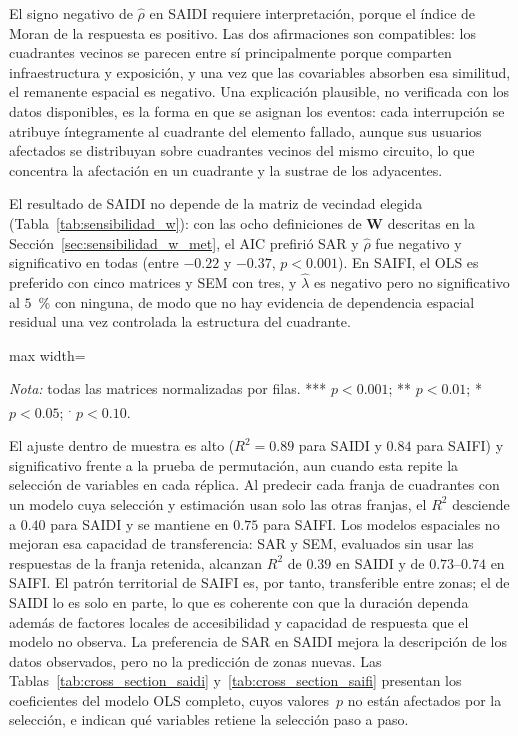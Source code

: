 El signo negativo de $\hat\rho$ en SAIDI requiere interpretación, porque el índice de Moran de la respuesta es positivo. Las dos afirmaciones son compatibles: los cuadrantes vecinos se parecen entre sí principalmente porque comparten infraestructura y exposición, y una vez que las covariables absorben esa similitud, el remanente espacial es negativo. Una explicación plausible, no verificada con los datos disponibles, es la forma en que se asignan los eventos: cada interrupción se atribuye íntegramente al cuadrante del elemento fallado, aunque sus usuarios afectados se distribuyan sobre cuadrantes vecinos del mismo circuito, lo que concentra la afectación en un cuadrante y la sustrae de los adyacentes.

El resultado de SAIDI no depende de la matriz de vecindad elegida (Tabla~\ref{tab:sensibilidad_w}): con las ocho definiciones de $\mathbf{W}$ descritas en la Sección~\ref{sec:sensibilidad_w_met}, el AIC prefirió SAR y $\hat\rho$ fue negativo y significativo en todas (entre $-0{.}22$ y $-0{.}37$, $p<0{.}001$). En SAIFI, el OLS es preferido con cinco matrices y SEM con tres, y $\hat\lambda$ es negativo pero no significativo al $5$~\% con ninguna, de modo que no hay evidencia de dependencia espacial residual una vez controlada la estructura del cuadrante.

\begin{table}[!htbp]
\centering
\small
\caption{Sensibilidad de los modelos espaciales de corte transversal a la matriz de vecindad}
\label{tab:sensibilidad_w}
\begin{adjustbox}{max width=\linewidth}

\end{adjustbox}

\vspace{2pt}
\noindent\footnotesize\textit{Nota:} todas las matrices normalizadas por filas. *** $p<0{.}001$; ** $p<0{.}01$; * $p<0{.}05$; \textsuperscript{.} $p<0{.}10$.
\end{table}

El ajuste dentro de muestra es alto ($R^2=0{.}89$ para SAIDI y $0{.}84$ para SAIFI) y significativo frente a la prueba de permutación, aun cuando esta repite la selección de variables en cada réplica. Al predecir cada franja de cuadrantes con un modelo cuya selección y estimación usan solo las otras franjas, el $R^2$ desciende a $0{.}40$ para SAIDI y se mantiene en $0{.}75$ para SAIFI. Los modelos espaciales no mejoran esa capacidad de transferencia: SAR y SEM, evaluados sin usar las respuestas de la franja retenida, alcanzan $R^2$ de $0{.}39$ en SAIDI y de $0{.}73$--$0{.}74$ en SAIFI. El patrón territorial de SAIFI es, por tanto, transferible entre zonas; el de SAIDI lo es solo en parte, lo que es coherente con que la duración dependa además de factores locales de accesibilidad y capacidad de respuesta que el modelo no observa. La preferencia de SAR en SAIDI mejora la descripción de los datos observados, pero no la predicción de zonas nuevas. Las Tablas~\ref{tab:cross_section_saidi} y~\ref{tab:cross_section_saifi} presentan los coeficientes del modelo OLS completo, cuyos valores~$p$ no están afectados por la selección, e indican qué variables retiene la selección paso a paso.

